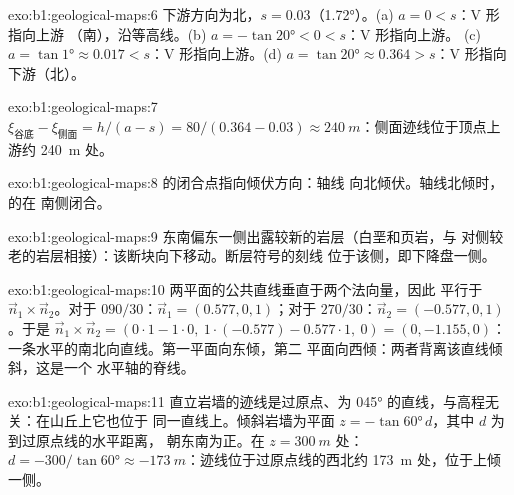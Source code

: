 \begin{solution}{exo:b1:geological-maps:6}
下游方向为北，$s = 0.03$（\ang{1.72}）。(a) $a = 0 < s$：V 形指向上游
（南），沿等高线。(b) $a = -\tan\ang{20} < 0 < s$：V 形指向上游。
(c) $a = \tan\ang{1} \approx 0.017 < s$：V 形指向上游。(d) $a = \tan\ang{20}
\approx 0.364 > s$：V 形指向下游（北）。
\end{solution}

\begin{solution}{exo:b1:geological-maps:7}
$\xi_{\text{谷底}} - \xi_{\text{侧面}} = h/(a - s) = 80/(0.364 - 0.03)
\approx \qty{240}{m}$：侧面迹线位于顶点上游约
\qty{240}{m} 处。
\end{solution}

\begin{solution}{exo:b1:geological-maps:8}
的闭合点指向倾伏方向：轴线
向北倾伏。轴线北倾时，的在
南侧闭合。
\end{solution}

\begin{solution}{exo:b1:geological-maps:9}
东南偏东一侧出露较新的岩层（白垩和页岩，与
对侧较老的岩层相接）：该断块向下移动。断层符号的刻线
位于该侧，即下降盘一侧。
\end{solution}

\begin{solution}{exo:b1:geological-maps:10}
两平面的公共直线垂直于两个法向量，因此
平行于 $\vec n_1 \times \vec n_2$。对于 $090/30$：$\vec n_1 = (0.577, 0,
1)$；对于 $270/30$：$\vec n_2 = (-0.577, 0, 1)$。于是 $\vec n_1 \times \vec n_2
= (0\cdot 1 - 1\cdot 0,\ 1\cdot(-0.577) - 0.577\cdot 1,\ 0) = (0, -1.155,
0)$：一条水平的南北向直线。第一平面向东倾，第二
平面向西倾：两者背离该直线倾斜，这是一个
水平轴的脊线。
\end{solution}

\begin{solution}{exo:b1:geological-maps:11}
直立岩墙的迹线是过原点、为
\ang{045} 的直线，与高程无关：在山丘上它也位于
同一直线上。倾斜岩墙为平面 $z = -\tan\ang{60}\,d$，其中 $d$ 为
到过原点线的水平距离，
朝东南为正。在 $z = \qty{300}{m}$ 处：$d = -300/\tan\ang{60}
\approx \qty{-173}{m}$：迹线位于过原点线的西北约
\qty{173}{m} 处，位于上倾一侧。
\end{solution}

